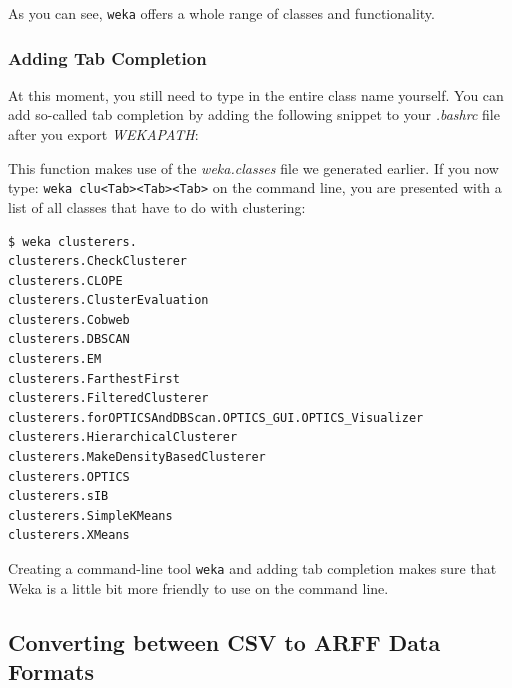 \documentclass[
]{book}
\newenvironment{Shaded}{\begin{snugshade}}{\end{snugshade}}
\newcommand{\BuiltInTok}[1]{#1}
\newcommand{\FunctionTok}[1]{\textcolor[rgb]{0.00,0.00,0.00}{#1}}
\newcommand{\KeywordTok}[1]{\textcolor[rgb]{0.13,0.29,0.53}{\textbf{#1}}}
\newcommand{\NormalTok}[1]{#1}
\newcommand{\StringTok}[1]{\textcolor[rgb]{0.31,0.60,0.02}{#1}}
\newcommand{\VariableTok}[1]{\textcolor[rgb]{0.00,0.00,0.00}{#1}}
\theoremstyle{definition}
\theoremstyle{definition}
\theoremstyle{definition}
\theoremstyle{remark}
\begin{document}
As you can see, \texttt{weka} offers a whole range of classes and functionality.

\hypertarget{adding-tab-completion}{%
\subsubsection{Adding Tab Completion}\label{adding-tab-completion}}

At this moment, you still need to type in the entire class name yourself. You can add so-called tab completion by adding the following snippet to your \emph{.bashrc} file after you export \emph{WEKAPATH}:

\begin{Shaded}
\end{Shaded}

This function makes use of the \emph{weka.classes} file we generated earlier. If you now type: \texttt{weka\ clu\textless{}Tab\textgreater{}\textless{}Tab\textgreater{}\textless{}Tab\textgreater{}} on the command line, you are presented with a list of all classes that have to do with clustering:

\begin{verbatim}
$ weka clusterers.
clusterers.CheckClusterer
clusterers.CLOPE
clusterers.ClusterEvaluation
clusterers.Cobweb
clusterers.DBSCAN
clusterers.EM
clusterers.FarthestFirst
clusterers.FilteredClusterer
clusterers.forOPTICSAndDBScan.OPTICS_GUI.OPTICS_Visualizer
clusterers.HierarchicalClusterer
clusterers.MakeDensityBasedClusterer
clusterers.OPTICS
clusterers.sIB
clusterers.SimpleKMeans
clusterers.XMeans
\end{verbatim}

Creating a command-line tool \texttt{weka} and adding tab completion makes sure that Weka is a little bit more friendly to use on the command line.

\hypertarget{converting-between-csv-to-arff-data-formats}{%
\subsection{Converting between CSV to ARFF Data Formats}\label{converting-between-csv-to-arff-data-formats}}
\end{document}

